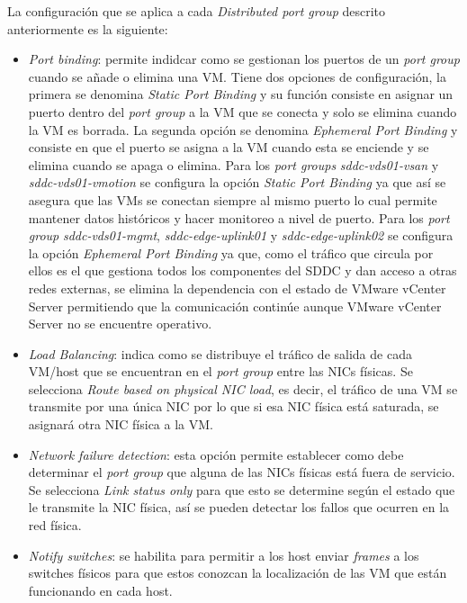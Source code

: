 La configuración que se aplica a cada \textit{Distributed port group} descrito anteriormente es la siguiente:
\begin{itemize}
  \item \textit{Port binding}: permite indidcar como se gestionan los puertos de un \textit{port group} cuando se añade o elimina una VM. Tiene dos opciones de configuración, la primera se denomina \textit{Static Port Binding} y su función consiste en asignar un puerto dentro del \textit{port group} a la VM que se conecta y solo se elimina cuando la VM es borrada. La segunda opción se denomina \textit{Ephemeral Port Binding} y consiste en que el puerto se asigna a la VM cuando esta se enciende y se elimina cuando se apaga o elimina. Para los \textit{port groups} \textit{sddc-vds01-vsan} y \textit{sddc-vds01-vmotion} se configura la opción \textit{Static Port Binding} ya que así se asegura que las VMs se conectan siempre al mismo puerto lo cual permite mantener datos históricos y hacer monitoreo a nivel de puerto. Para los \textit{port group} \textit{sddc-vds01-mgmt}, \textit{sddc-edge-uplink01} y \textit{sddc-edge-uplink02} se configura la opción \textit{Ephemeral Port Binding} ya que, como el tráfico que circula por ellos es el que gestiona todos los componentes del SDDC y dan acceso a otras redes externas, se elimina la dependencia con el estado de VMware vCenter Server permitiendo que la comunicación continúe aunque VMware vCenter Server no se encuentre operativo.

  \item \textit{Load Balancing}: indica como se distribuye el tráfico de salida de cada VM/host que se encuentran en el \textit{port group} entre las NICs físicas. Se selecciona \textit{Route based on physical NIC load}, es decir, el tráfico de una VM se transmite por una única NIC por lo que si esa NIC física está saturada, se asignará otra NIC física a la VM.
  
  \item \textit{Network failure detection}: esta opción permite establecer como debe determinar el \textit{port group} que alguna de las NICs físicas está fuera de servicio. Se selecciona \textit{Link status only} para que esto se determine según el estado que le transmite la NIC física, así se pueden detectar los fallos que ocurren en la red física.
  
  \item \textit{Notify switches}: se habilita para permitir a los host enviar \textit{frames} a los switches físicos para que estos conozcan la localización de las VM que están funcionando en cada host.
  

\end{itemize}
